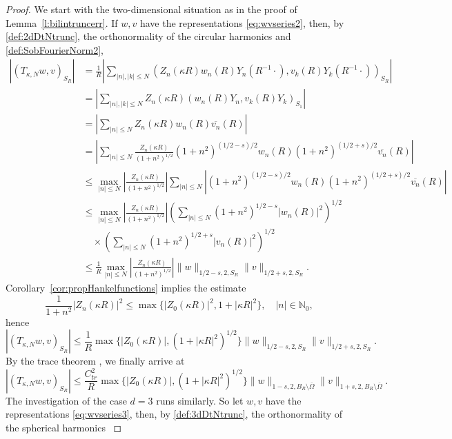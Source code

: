 \documentclass[12pt,DIV=14]{scrartcl}
\providecommand{\N}{\mathbb{N}}
\providecommand{\Om}{\Omega}
\begin{document}
\begin{proof}
We start with the two-dimensional situation
as in the proof of Lemma~\ref{l:bilintruncerr}.
If $w,v$ have the representations \eqref{eq:wvseries2},
then, by \eqref{def:2dDtNtrunc},
the orthonormality of the circular harmonics \cite[Prop.~3.2.1]{Zeidler:95a}
and \eqref{def:SobFourierNorm2},
\begin{align*}
\left|(T_{\kappa,N} w,v)_{S_R}\right|
&= \frac{1}{R}\left|\sum_{|n|,|k|\le N}
\left(Z_n(\kappa R)w_n(R)Y_n(R^{-1}\cdot),v_k(R)Y_k(R^{-1}\cdot)\right)_{S_R}\right|
\\
&= \left|\sum_{|n|,|k|\le N}
Z_n(\kappa R)\left(w_n(R)Y_n,v_k(R)Y_k\right)_{S_1}\right|
\\
&= \left|\sum_{|n|\le N}
Z_n(\kappa R)w_n(R)\overline{v_n}(R)\right|\\
&= \left|\sum_{|n|\le N}
\frac{Z_n(\kappa R)}{(1+n^2)^{1/2}}(1+n^2)^{(1/2-s)/2}w_n(R)(1+n^2)^{(1/2+s)/2}\overline{v_n}(R)\right|\\
&\le \max_{|n|\le N}
\left|\frac{Z_n(\kappa R)}{(1+n^2)^{1/2}}\right|
\sum_{|n|\le N}\left|(1+n^2)^{(1/2-s)/2}w_n(R)(1+n^2)^{(1/2+s)/2}\overline{v_n}(R)\right|\\
&\le \max_{|n|\le N}
\left|\frac{Z_n(\kappa R)}{(1+n^2)^{1/2}}\right|
\left(\sum_{|n|\le N}(1+n^2)^{1/2-s}\left|w_n(R)\right|^2\right)^{1/2}\\
&\quad \times
\left(\sum_{|n|\le N}(1+n^2)^{1/2+s}\left|v_n(R)\right|^2\right)^{1/2}\\
&\le \frac{1}{R}\max_{|n|\le N}
\left|\frac{Z_n(\kappa R)}{(1+n^2)^{1/2}}\right|\|w\|_{1/2-s,2,S_R}\|v\|_{1/2+s,2,S_R}.
\end{align*}
Corollary~\ref{cor:propHankelfunctions} implies the estimate
\[
\frac{1}{1+n^2} |Z_n(\kappa R)|^2 \le \max\{|Z_0(\kappa R)|^2,1 + |\kappa R|^2\},
\quad
|n|\in\N_0,
\]
hence
\begin{equation}\label{eq:TkuniformcontinuitySR2}
\left|(T_{\kappa,N} w,v)_{S_R}\right|
\le \frac{1}{R}\max\{|Z_0(\kappa R)|,(1 + |\kappa R|^2)^{1/2}\}\|w\|_{1/2-s,2,S_R}\|v\|_{1/2+s,2,S_R}.
\end{equation}
By the trace theorem \cite[Thm.~3.38]{McLean:00}, we finally arrive at
\[
\left|(T_{\kappa,N} w,v)_{S_R}\right|
\le \frac{C_{tr}^2}{R}\max\{|Z_0(\kappa R)|,(1 + |\kappa R|^2)^{1/2}\}
\|w\|_{1-s,2,B_R\setminus\overline\Om}\|v\|_{1+s,2,B_R\setminus\overline\Om}.
\]
The investigation of the case $d=3$ runs similarly.
So let $w,v$ have the representations \eqref{eq:wvseries3},
then, by \eqref{def:3dDtNtrunc},
the orthonormality of the spherical harmonics \cite[Thm.~2.8]{Colton:19}

\end{proof}
\end{document}
